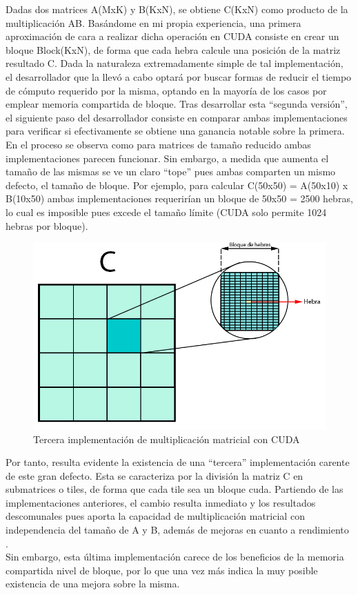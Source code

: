 Dadas dos matrices A(MxK) y B(KxN), se obtiene C(KxN) como producto de la multiplicación AB. Basándome en mi propia experiencia, una primera aproximación de cara a realizar dicha operación en CUDA consiste en crear un bloque Block(KxN), de forma que cada hebra calcule una posición de la matriz resultado C. Dada la naturaleza extremadamente simple de tal implementación, el desarrollador que la llevó a cabo optará por buscar formas de reducir el tiempo de cómputo requerido por la misma, optando en la mayoría de los casos por emplear memoria compartida de bloque. Tras desarrollar esta ``segunda versión'', el siguiente paso del desarrollador consiste en comparar ambas implementaciones para verificar si efectivamente se obtiene una ganancia notable sobre la primera. En el proceso se observa como para matrices de tamaño reducido ambas implementaciones parecen funcionar. Sin embargo, a medida que aumenta el tamaño de las mismas se ve un claro ``tope'' pues ambas comparten un mismo defecto, el tamaño de bloque. Por ejemplo, para calcular C(50x50) = A(50x10) x B(10x50) ambas implementaciones requerirían un bloque de 50x50 = 2500 hebras, lo cual es imposible pues excede el tamaño límite (CUDA solo permite 1024 hebras por bloque). \\

\begin{figure}[H]
	\centering
	\includegraphics[scale=0.3]{imagenes/gemm_tile_v3.jpg}  
	\caption{Tercera implementación de multiplicación matricial con CUDA}
	\label{fig:mult_matrix_cuda_v3}
\end{figure}

Por tanto, resulta evidente la existencia de una ``tercera'' implementación carente de este gran defecto. Esta se caracteriza por la división la matriz C en submatrices o tiles, de forma que cada tile sea un bloque cuda. Partiendo de las implementaciones anteriores, el cambio resulta inmediato y los resultados descomunales pues aporta la capacidad de multiplicación matricial con independencia del tamaño de A y B, además de mejoras en cuanto a rendimiento \cite{cuda_mult_matrix_v3}. \\
Sin embargo, esta última implementación carece de los beneficios de la memoria compartida nivel de bloque, por lo que una vez más indica la muy posible existencia de una mejora sobre la misma. \\

